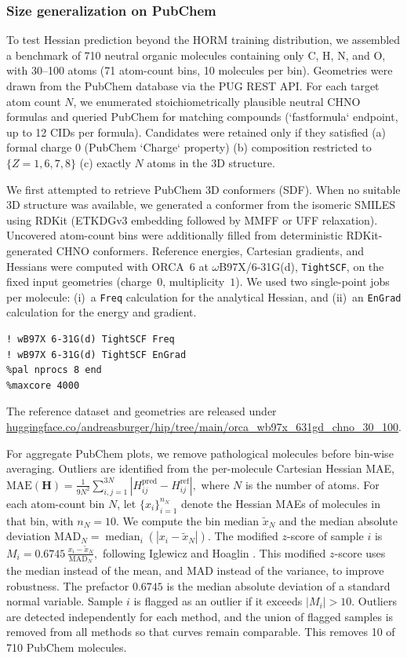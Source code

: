 \documentclass[pdflatex,sn-mathphys-num]{sn-jnl}%
\theoremstyle{thmstyleone}%
\theoremstyle{thmstyletwo}%
\theoremstyle{thmstylethree}%
\begin{document}
\begin{appendices}
\subsubsection{Size generalization on PubChem\label{sec:pubchemorca}}

To test Hessian prediction beyond the HORM training distribution, we assembled a benchmark of 710 neutral organic molecules containing only C, H, N, and O, with 30–100 atoms (71 atom-count bins, 10 molecules per bin). Geometries were drawn from the PubChem database via the PUG REST API. For each target atom count \(N\), we enumerated stoichiometrically plausible neutral CHNO formulas and queried PubChem for matching compounds (`fastformula` endpoint, up to 12 CIDs per formula). Candidates were retained only if they satisfied 
(a) formal charge 0 (PubChem `Charge` property)
(b) composition restricted to \(\{Z=1,6,7,8\}\) (c) exactly \(N\) atoms in the 3D structure.

We first attempted to retrieve PubChem 3D conformers (SDF). When no suitable 3D structure was available, we generated a conformer from the isomeric SMILES using RDKit (ETKDGv3 embedding followed by MMFF or UFF relaxation). Uncovered atom-count bins were additionally filled from deterministic RDKit-generated CHNO conformers. 
Reference energies, Cartesian gradients, and Hessians were computed with ORCA~6
at $\omega$B97X/6-31G(d), \texttt{TightSCF}, on the fixed input geometries
(charge~$0$, multiplicity~$1$).
We used two single-point jobs per molecule:
(i)~a \texttt{Freq} calculation for the analytical Hessian, and
(ii)~an \texttt{EnGrad} calculation for the energy and gradient.
\begin{verbatim}
! wB97X 6-31G(d) TightSCF Freq
! wB97X 6-31G(d) TightSCF EnGrad
%pal nprocs 8 end
%maxcore 4000
\end{verbatim}
The reference dataset and geometries are released under \url{huggingface.co/andreasburger/hip/tree/main/orca_wb97x_631gd_chno_30_100}.

For aggregate PubChem plots, we remove pathological molecules before bin-wise averaging.
Outliers are identified from the per-molecule Cartesian Hessian MAE,
\(
  \mathrm{MAE}(\mathbf{H}) = \frac{1}{9N^2}\sum_{i,j=1}^{3N}\left|H^{\mathrm{pred}}_{ij}-H^{\mathrm{ref}}_{ij}\right|,
\)
where $N$ is the number of atoms.
For each atom-count bin $N$, let $\{x_i\}_{i=1}^{n_N}$ denote the Hessian MAEs of molecules in that bin, with $n_N=10$.
We compute the bin median $\tilde{x}_N$ and the median absolute deviation
\(
  \mathrm{MAD}_N = \operatorname{median}_i\!\left(\left|x_i-\tilde{x}_N\right|\right).
\)
The modified $z$-score of sample $i$ is
\(
  M_i = 0.6745\,\frac{x_i-\tilde{x}_N}{\mathrm{MAD}_N},
\)
following Iglewicz and Hoaglin \citep{iglewicz1993outliers}. This modified $z$-score uses the median instead of the mean, and MAD instead of the variance, to improve robustness. The prefactor $0.6745$ is the median absolute deviation of a standard normal variable.
Sample $i$ is flagged as an outlier if it exceeds $|M_i|>10$.
Outliers are detected independently for each method, and the union of flagged
samples is removed from all methods so that curves remain comparable.
This removes 10 of 710 PubChem molecules.


\end{appendices}
\end{document}
